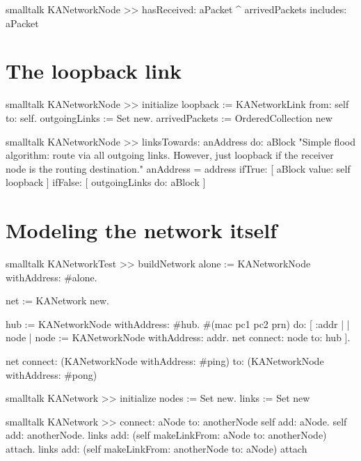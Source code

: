 \documentclass[10pt,twoside,english]{_support/latex/sbabook/sbabook}
\begin{document}
\begin{displaycode}{smalltalk}
KANetworkNode >> hasReceived: aPacket
    ^ arrivedPackets includes: aPacket
\end{displaycode}
\section{The loopback link}
\begin{displaycode}{smalltalk}
KANetworkNode >> initialize
    loopback := KANetworkLink from: self to: self.
    outgoingLinks := Set new.
    arrivedPackets := OrderedCollection new
\end{displaycode}

\begin{displaycode}{smalltalk}
KANetworkNode >> linksTowards: anAddress do: aBlock
    "Simple flood algorithm: route via all outgoing links.
    However, just loopback if the receiver node is the routing destination."
    anAddress = address
        ifTrue: [ aBlock value: self loopback ]
        ifFalse: [ outgoingLinks do: aBlock ]
\end{displaycode}
\section{Modeling the network itself}
\begin{displaycode}{smalltalk}
KANetworkTest >> buildNetwork
    alone := KANetworkNode withAddress: #alone.

    net := KANetwork new.

    hub := KANetworkNode withAddress: #hub.
    #(mac pc1 pc2 prn) do: [ :addr |
        | node |
        node := KANetworkNode withAddress: addr.
        net connect: node to: hub ].

    net
        connect: (KANetworkNode withAddress: #ping)
        to: (KANetworkNode withAddress: #pong)
\end{displaycode}

\begin{displaycode}{smalltalk}
KANetwork >> initialize
    nodes := Set new.
    links := Set new
\end{displaycode}

\begin{displaycode}{smalltalk}
KANetwork >> connect: aNode to: anotherNode
    self add: aNode.
    self add: anotherNode.
    links add: (self makeLinkFrom: aNode to: anotherNode) attach.
    links add: (self makeLinkFrom: anotherNode to: aNode) attach
\end{displaycode}
\end{document}
